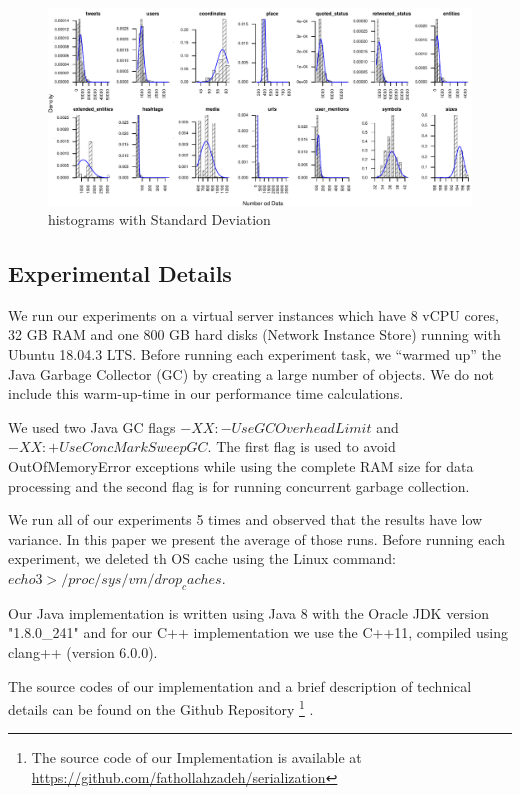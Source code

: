 \begin{figure}
	\centering
	\includegraphics[scale=1]{img/Data_Overview.pdf}
	\caption{histograms with Standard Deviation}
	\label{fig:data_overview}
\end{figure}

\subsection{Experimental Details}
We run our experiments on a virtual server instances which have 8 vCPU cores, 32 GB RAM and one 800
GB hard disks (Network Instance Store) running with Ubuntu 18.04.3 LTS. Before running each experiment task, we “warmed up” the Java Garbage Collector (GC) by creating a large number of objects. We do not include this warm-up-time in our performance time calculations.

We used two Java GC flags $-XX:-UseGCOverheadLimit$ and $-XX:+UseConcMarkSweepGC$. The first flag is used to avoid OutOfMemoryError exceptions while using the complete RAM size for data processing and the second flag is for running concurrent garbage collection.

We run all of our experiments 5 times and observed that the results have low variance. In this paper we present the average of those runs. Before running each experiment, we
deleted th OS cache using the Linux command: $echo 3 > /proc/sys/vm/drop_caches$.

Our Java implementation is written using Java 8 with the Oracle JDK version "1.8.0\_241" and for our C++ implementation we use the C++11, compiled using clang++ (version 6.0.0).

The source codes of our implementation and a brief description of technical details can be found on the Github Repository \footnote{The source code of our Implementation is available at \url{https://github.com/fathollahzadeh/serialization}} .
